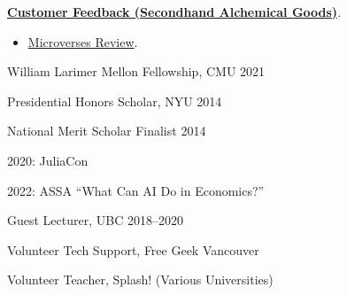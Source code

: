 \documentclass[12pt,article,oneside]{memoir}   %
\begin{document}
\textbf{\href{https://dailysciencefiction.com/fantasy/fantasy/arnav-sood/customer-feedback-secondhand-alchemical-goods}{Customer Feedback (Secondhand Alchemical Goods)}}. 
\begin{itemize}
  \setlength{\leftskip}{1cm} \item  \href{https://microverses.net/archives/250}{Microverses Review}.
\end{itemize}


{\vskip 0.1in}
\bigskip

\setlength{\leftskip}{0cm}

William Larimer Mellon Fellowship, CMU \hfill 2021\vspace{0.1in}

Presidential Honors Scholar, NYU \hfill 2014\vspace{0.1 in}

National Merit Scholar Finalist \hfill 2014

{\vskip 0.1in}
\bigskip

\setlength{\leftskip}{0cm}

2020: JuliaCon \vspace{0.1in}

2022: ASSA ``What Can AI Do in Economics?''

{\vskip 0.1in}
\bigskip


\setlength{\leftskip}{0cm}

Guest Lecturer, UBC \hfill 2018--2020

{\vskip 0.1in}
\bigskip





\setlength{\leftskip}{0cm}

Volunteer Tech Support, Free Geek Vancouver \vspace{0.1in}

Volunteer Teacher, Splash! (Various Universities)
\end{document}
